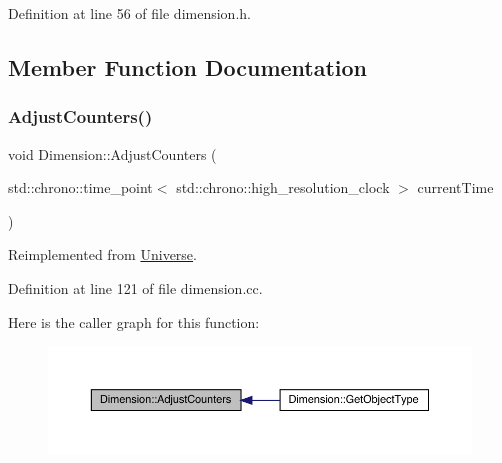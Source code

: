 Definition at line 56 of file dimension.\+h.



\subsection{Member Function Documentation}
\mbox{\label{class_dimension_a31e28c2777888449fad32843f6dd15ed}} 
\subsubsection{\texorpdfstring{Adjust\+Counters()}{AdjustCounters()}}
{\footnotesize\ttfamily void Dimension\+::\+Adjust\+Counters (\begin{DoxyParamCaption}\item[{std\+::chrono\+::time\+\_\+point$<$ std\+::chrono\+::high\+\_\+resolution\+\_\+clock $>$}]{current\+Time }\end{DoxyParamCaption})\hspace{0.3cm}{\ttfamily [virtual]}}



Reimplemented from \hyperlink{class_universe_a15aa20218286fd11ecb9b792dfb63be3}{Universe}.



Definition at line 121 of file dimension.\+cc.

Here is the caller graph for this function\+:
\nopagebreak
\begin{figure}[H]
\begin{center}
\leavevmode
\includegraphics[width=350pt]{class_dimension_a31e28c2777888449fad32843f6dd15ed_icgraph}
\end{center}
\end{figure}
\mbox{\label{class_dimension_a65bcd3c09792cf53b1f614eff49cf111}} 
